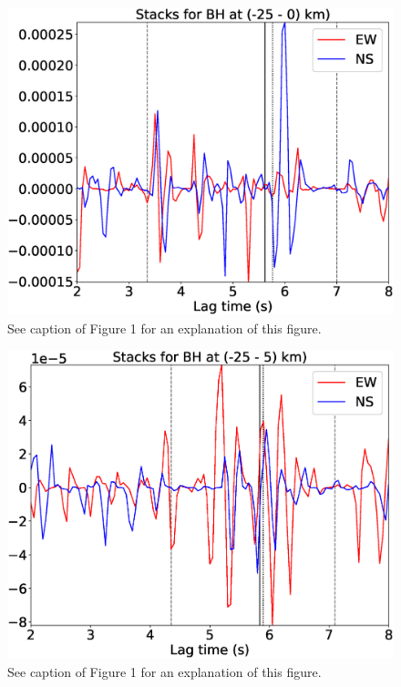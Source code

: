 \documentclass[letterpaper, 12pt]{article}
\begin{document}
\begin{figure}[H]
\includegraphics[width=\linewidth]{figures/intervals/BH_-25_000_stacks.eps}
\caption{See caption of Figure 1 for an explanation of this figure.}
\end{figure}

\begin{figure}[H]
\includegraphics[width=\linewidth]{figures/intervals/BH_-25_005_stacks.eps}
\caption{See caption of Figure 1 for an explanation of this figure.}
\end{figure}
\end{document}
